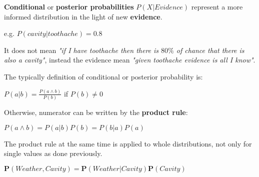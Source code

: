 \begin{definition}
    \textbf{Conditional} or \textbf{posterior probabilities} $P(X|Evidence)$ represent a more informed distribution in the light of new \textbf{evidence}. \vspace{3.5pt}

    e.g. $P(cavity|toothache) = 0.8$ \vspace{3.5pt}

    It does not mean \textit{"if I have toothache then there is $80\%$ of chance that there is also a cavity"}, instead the evidence mean \textit{"given toothache evidence is all I know"}. \vspace{3.5pt}

    The typically definition of conditional or posterior probability is: \vspace{3.5pt}

    \begin{center}
        $P(a|b) = \frac{P(a \land b)}{P(b)}$ if $P(b)\neq0$
    \end{center} \vspace{3.5pt}

    Otherwise, numerator can be written by the \textbf{product rule}: \vspace{3.5pt}
    
    \begin{center}
        $P(a \land b) = P(a|b)P(b) = P(b|a)P(a)$
    \end{center} \vspace{3.5pt}

    The product rule at the same time is applied to whole distributions, not only for single values as done previously. \vspace{3.5pt}
    
    \begin{center}
        $\mathbf{P}(Weather, Cavity) = \mathbf{P}(Weather|Cavity)\mathbf{P}(Cavity)$
    \end{center} \vspace{3.5pt}
\end{definition}